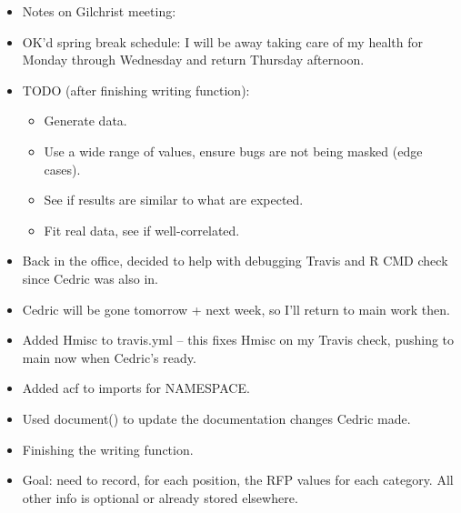 \documentclass[12pt,hyperref]{labbook}
\begin{document}
\begin{itemize}
    \item Notes on Gilchrist meeting:
    \item OK'd spring break schedule: I will be away taking care of my health for Monday through Wednesday and return Thursday afternoon.
    \item TODO (after finishing writing function):
    \begin{itemize}
        \item Generate data.
        \item Use a wide range of values, ensure bugs are not being masked (edge cases).
        \item See if results are similar to what are expected.
        \item Fit real data, see if well-correlated.
    \end{itemize}
\end{itemize}


\begin{itemize}
    \item Back in the office, decided to help with debugging Travis and R CMD check since Cedric was also in.
    \item Cedric will be gone tomorrow + next week, so I'll return to main work then.
    \item Added Hmisc to travis.yml -- this fixes Hmisc on my Travis check, pushing to main now when Cedric's ready.
    \item Added acf to imports for NAMESPACE.
    \item Used document() to update the documentation changes Cedric made.
\end{itemize}


\begin{itemize}
    \item Finishing the writing function.
    \item Goal: need to record, for each position, the RFP values for each category. All other info is optional or already stored elsewhere.
\end{itemize}

\end{document}
